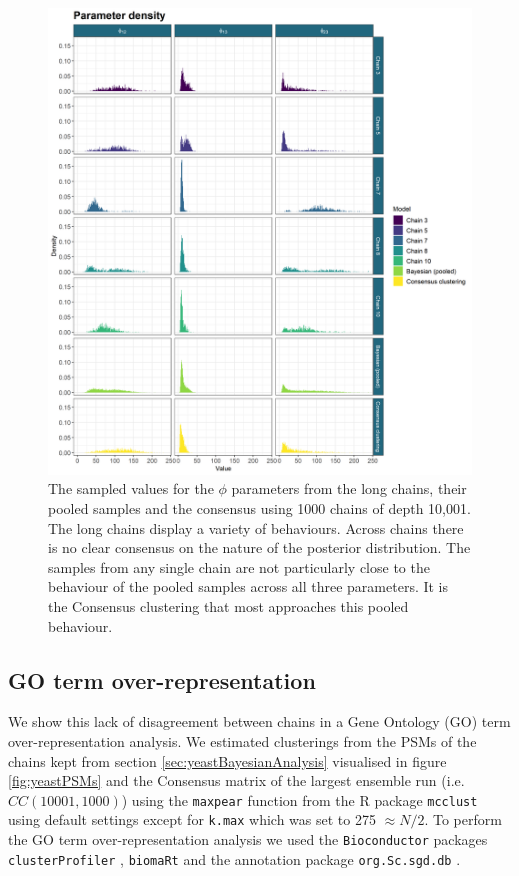 \documentclass[]{article}
\begin{document}
\begin{figure}
	\centering
	\includegraphics[scale=0.6]{./Images/Yeast/ComparisonDensities.png}
	\caption{The sampled values for the $\phi$ parameters from the long chains, their pooled samples and the consensus using 1000 chains of depth 10,001. The long chains display a variety of behaviours. Across chains there is no clear consensus on the nature of the posterior distribution. The samples from any single chain are not particularly close to the behaviour of the pooled samples across all three parameters. It is the Consensus clustering that most approaches this pooled behaviour.}
	\label{fig:densityComparison}
\end{figure}





\subsection{GO term over-representation} \label{sec:goTermOverRep}
We show this lack of disagreement between chains in a Gene Ontology (GO) term over-representation analysis. We estimated clusterings from the PSMs of the chains kept from section \ref{sec:yeastBayesianAnalysis} visualised in figure \ref{fig:yeastPSMs} and the Consensus matrix of the largest ensemble run (i.e. $CC(10001, 1000)$) using the \texttt{maxpear} function from the R package \texttt{mcclust} \cite{fritsch2012mcclust} using default settings except for \texttt{k.max} which was set to 275 $\approx N/2$. To perform the GO term over-representation analysis we used the \texttt{Bioconductor} packages \texttt{clusterProfiler} \citep{yu2012clusterProfiler}, \texttt{biomaRt} \citep{durinck2009mapping} and the annotation package \texttt{org.Sc.sgd.db} \citep{carlson2014org}.
\end{document}
